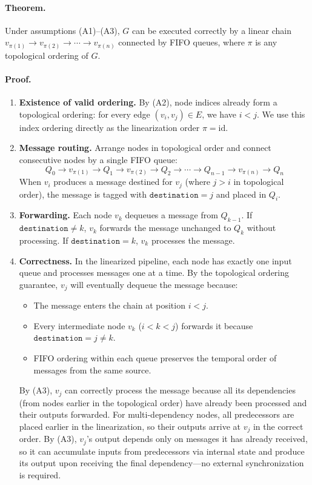 \documentclass[11pt,a4paper]{article}
\begin{document}
\paragraph{Theorem.}
Under assumptions (A1)--(A3), $G$ can be executed correctly by a linear chain $v_{\pi(1)} \rightarrow v_{\pi(2)} \rightarrow \cdots \rightarrow v_{\pi(n)}$ connected by FIFO queues, where $\pi$ is any topological ordering of $G$.

\paragraph{Proof.}
\begin{enumerate}
    \item \textbf{Existence of valid ordering.} By (A2), node indices already form a topological ordering: for every edge $(v_i, v_j) \in E$, we have $i < j$. We use this index ordering directly as the linearization order $\pi = \text{id}$.

    \item \textbf{Message routing.} Arrange nodes in topological order and connect consecutive nodes by a single FIFO queue:
    \[
    Q_0 \rightarrow v_{\pi(1)} \rightarrow Q_1 \rightarrow v_{\pi(2)} \rightarrow Q_2 \rightarrow \cdots \rightarrow Q_{n-1} \rightarrow v_{\pi(n)} \rightarrow Q_n
    \]
    When $v_i$ produces a message destined for $v_j$ (where $j > i$ in topological order), the message is tagged with $\texttt{destination} = j$ and placed in $Q_i$.

    \item \textbf{Forwarding.} Each node $v_k$ dequeues a message from $Q_{k-1}$. If $\texttt{destination} \neq k$, $v_k$ forwards the message unchanged to $Q_k$ without processing. If $\texttt{destination} = k$, $v_k$ processes the message.

    \item \textbf{Correctness.} In the linearized pipeline, each node has exactly one input queue and processes messages one at a time. By the topological ordering guarantee, $v_j$ will eventually dequeue the message because:
    \begin{itemize}[nosep]
        \item The message enters the chain at position $i < j$.
        \item Every intermediate node $v_k$ ($i < k < j$) forwards it because $\texttt{destination} = j \neq k$.
        \item FIFO ordering within each queue preserves the temporal order of messages from the same source.
    \end{itemize}
    By (A3), $v_j$ can correctly process the message because all its dependencies (from nodes earlier in the topological order) have already been processed and their outputs forwarded. For multi-dependency nodes, all predecessors are placed earlier in the linearization, so their outputs arrive at $v_j$ in the correct order. By (A3), $v_j$'s output depends only on messages it has already received, so it can accumulate inputs from predecessors via internal state and produce its output upon receiving the final dependency---no external synchronization is required.

\end{enumerate}
\end{document}

